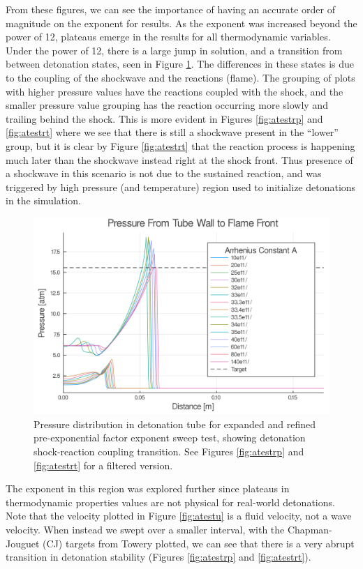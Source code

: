 From these figures, we can see the importance of having an accurate order of magnitude on the exponent for results. As the exponent was increased beyond the power of 12, plateaus emerge in the results for all thermodynamic variables. Under the power of 12, there is a large jump in solution, and a transition from between detonation states, seen in Figure \ref{fig:pjump}. The differences in these states is due to the coupling of the shockwave and the reactions (flame). The grouping of plots with higher pressure values have the reactions coupled with the shock, and the smaller pressure value grouping has the reaction occurring more slowly and trailing behind the shock. This is more evident in Figures \ref{fig:atestrp} and \ref{fig:atestrt} where we see that there is still a shockwave present in the ``lower'' group, but it is clear by Figure \ref{fig:atestrt} that the reaction process is happening much later than the shockwave instead right at the shock front. Thus presence of a shockwave in this scenario is not due to the sustained reaction, and was triggered by high pressure (and temperature) region used to initialize detonations in the simulation. 

\begin{figure}
\centering
\includegraphics[width=0.85\linewidth]{./figs/Atest_refined/p_large.png}
\caption{Pressure distribution in detonation tube for expanded and refined pre-exponential factor exponent sweep test, showing detonation shock-reaction coupling transition. See Figures \ref{fig:atestrp} and \ref{fig:atestrt} for a filtered version.}
\label{fig:pjump}
\end{figure}


The exponent in this region was explored further since plateaus in thermodynamic properties values are not physical for real-world detonations. Note that the velocity plotted in Figure \ref{fig:atestu} is a fluid velocity, not a wave velocity. When instead we swept over a smaller interval, with the Chapman-Jouguet (CJ) targets from Towery\cite{towery1} plotted, we can see that there is a very abrupt transition in detonation stability (Figures \ref{fig:atestrp} and \ref{fig:atestrt}). 


